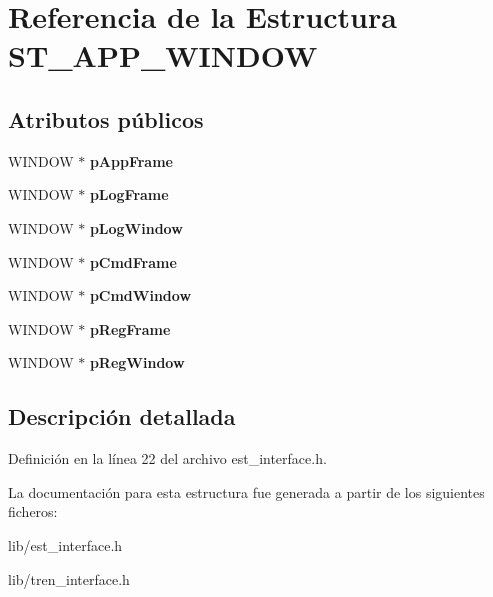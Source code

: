 \hypertarget{structST__APP__WINDOW}{}\section{Referencia de la Estructura S\+T\+\_\+\+A\+P\+P\+\_\+\+W\+I\+N\+D\+OW}
\label{structST__APP__WINDOW}
\subsection*{Atributos públicos}
\begin{DoxyCompactItemize}
\item 
\mbox{\label{structST__APP__WINDOW_a6f6df6f654650ca8346cbe2d7e00bc8d}} 
W\+I\+N\+D\+OW $\ast$ {\bfseries p\+App\+Frame}
\item 
\mbox{\label{structST__APP__WINDOW_a33453082854f7acad2ca256d928c08b1}} 
W\+I\+N\+D\+OW $\ast$ {\bfseries p\+Log\+Frame}
\item 
\mbox{\label{structST__APP__WINDOW_a9deec49da54fa047236b37c98facda8c}} 
W\+I\+N\+D\+OW $\ast$ {\bfseries p\+Log\+Window}
\item 
\mbox{\label{structST__APP__WINDOW_a7eedca3dcaa907d74b2bc62a609d4123}} 
W\+I\+N\+D\+OW $\ast$ {\bfseries p\+Cmd\+Frame}
\item 
\mbox{\label{structST__APP__WINDOW_a9725582782f4c1379b0d309942afb462}} 
W\+I\+N\+D\+OW $\ast$ {\bfseries p\+Cmd\+Window}
\item 
\mbox{\label{structST__APP__WINDOW_aed514c448a9901b6c9c3df3d9398f7ea}} 
W\+I\+N\+D\+OW $\ast$ {\bfseries p\+Reg\+Frame}
\item 
\mbox{\label{structST__APP__WINDOW_a31cb58ce3a8584bc825d11bc2f187ca7}} 
W\+I\+N\+D\+OW $\ast$ {\bfseries p\+Reg\+Window}
\end{DoxyCompactItemize}


\subsection{Descripción detallada}


Definición en la línea 22 del archivo est\+\_\+interface.\+h.



La documentación para esta estructura fue generada a partir de los siguientes ficheros\+:\begin{DoxyCompactItemize}
\item 
lib/est\+\_\+interface.\+h\item 
lib/tren\+\_\+interface.\+h\end{DoxyCompactItemize}
